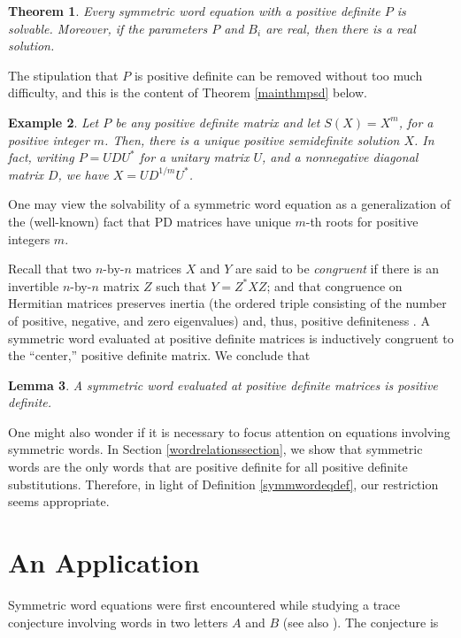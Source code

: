 \documentclass{amsart}
\newtheorem{thm}{Theorem}[section]
\newtheorem{ex}[thm]{Example}
\newtheorem{lem}[thm]{Lemma}
\theoremstyle{definition}
\theoremstyle{remark}
\numberwithin{equation}{section}
\newcommand{\<}{\langle}
\renewcommand{\>}{\rangle}
\begin{document}
\begin{thm}\label{HJexistencethm}
Every symmetric word equation with a positive definite $P$ is solvable.  Moreover, if the parameters $P$ and $B_i$ are real, then there is a real solution. 
\end{thm}

The stipulation that $P$ is positive definite can be removed without too much difficulty, and this is the content of Theorem \ref{mainthmpsd} below.

\begin{ex}
Let $P$ be any positive definite matrix and let $S(X) = X^m$, for a positive integer $m$.  Then, there is a unique positive semidefinite solution $X$.  In fact, writing $P = UDU^*$ for a unitary matrix $U$, and a nonnegative
diagonal matrix $D$, we have $X = UD^{1/m}U^{*}$.
\end{ex}


One may view the solvability of a symmetric word equation as a generalization of the (well-known) fact that PD matrices have unique $m$-th roots for positive integers $m$.  

Recall that two $n$-by-$n$ matrices $X$ and $Y$ are said to be
{\it congruent} if there is an invertible $n$-by-$n$ matrix $Z$
such that $Y = Z^{*}XZ$; and that congruence on Hermitian matrices
preserves inertia (the ordered triple consisting of the number of
positive, negative, and zero eigenvalues) and, thus, positive
definiteness \cite[p. 223]{HJ1}. A symmetric word evaluated at positive definite matrices is inductively congruent to the ``center,'' positive definite matrix. We conclude that

\begin{lem}\label{symwordpdlem}
A symmetric word evaluated at positive definite matrices is positive
definite.
\end{lem}

One might also wonder if it is necessary to focus attention on equations involving symmetric words.  In Section \ref{wordrelationssection}, we show that symmetric words are the only words that are positive definite for all positive definite substitutions.  Therefore, in light of Definition \ref{symmwordeqdef}, our restriction seems appropriate.

\section{An Application}


Symmetric word equations were first encountered while studying a trace conjecture \cite{JH} involving words in two letters $A$ and $B$ (see also \cite{JHcplx,HJS}).  The conjecture is
\end{document}
